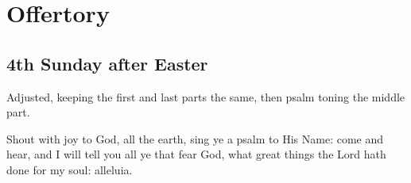 \documentclass[12pt,a4paper]{article}
\begin{document}
\autocompilegabc

\section{Offertory}

\subsection{4th Sunday after Easter}

Adjusted, keeping the first and last parts the same,
then psalm toning the middle part.

\bigskip


\bigskip

Shout with joy to God, all the earth, sing ye a psalm to His Name: come and hear, and I will tell you all ye that fear God, what great things the Lord hath done for my soul: alleluia.
\end{document}

